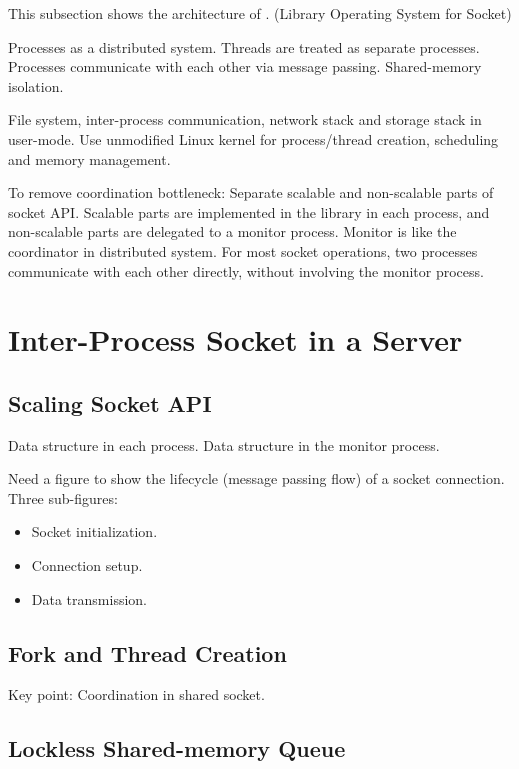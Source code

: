   

This subsection shows the architecture of \sys. (Library Operating System for Socket)

Processes as a distributed system.
Threads are treated as separate processes.
Processes communicate with each other via message passing.
Shared-memory isolation.

File system, inter-process communication, network stack and storage stack in user-mode.
Use unmodified Linux kernel for process/thread creation, scheduling and memory management.

To remove coordination bottleneck:
Separate scalable and non-scalable parts of socket API.
Scalable parts are implemented in the library in each process, and non-scalable parts are delegated to a monitor process.
Monitor is like the coordinator in distributed system.
For most socket operations, two processes communicate with each other directly, without involving the monitor process.



\section{Inter-Process Socket in a Server}
\label{sec:intra-server}

\subsection{Scaling Socket API}
\label{subsec:socket-api}

Data structure in each process. Data structure in the monitor process.

Need a figure to show the lifecycle (message passing flow) of a socket connection. Three sub-figures:

\begin{itemize}
	\item Socket initialization.
	\item Connection setup.
	\item Data transmission.
\end{itemize}


\subsection{Fork and Thread Creation}
\label{subsec:fork}

Key point: Coordination in shared socket.

\subsection{Lockless Shared-memory Queue}
\label{subsec:lockless-queue}

